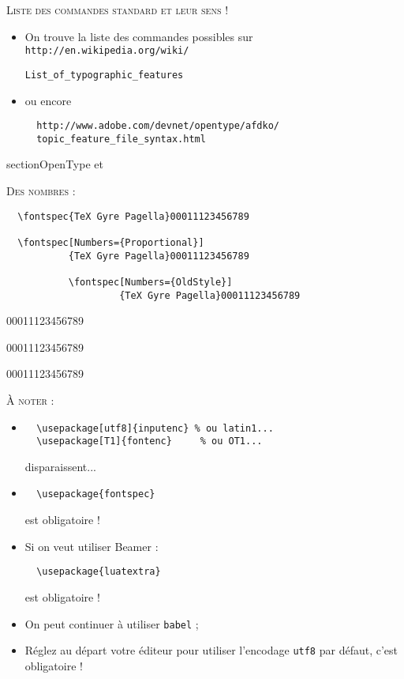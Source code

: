 \documentclass[12pt,a4paper,twocolumn]{book} %
\begin{document}
{		                          
		                          {\textsc{Liste des commandes standard et leur sens !}}
			                  
			                  \begin{itemize}
				          \item On trouve la liste des commandes possibles sur \verb=http://en.wikipedia.org/wiki/=
				            
				            \qquad\qquad\qquad\verb=List_of_typographic_features=
				          \item ou encore \begin{verbatim}
  http://www.adobe.com/devnet/opentype/afdko/
  topic_feature_file_syntax.html
\end{verbatim}
			                  \end{itemize}
		                          
		                          
	                                  section{OpenType et \LuaLaTeX}	
		                          
		                          
	                                  {\textsc{Des nombres :}}
\begin{verbatim}
  \fontspec{TeX Gyre Pagella}00011123456789

  \fontspec[Numbers={Proportional}]
           {TeX Gyre Pagella}00011123456789

           \fontspec[Numbers={OldStyle}]
                    {TeX Gyre Pagella}00011123456789
\end{verbatim}	


00011123456789

00011123456789

         00011123456789			
                  
                  
                  
                  
                  
                  {\textsc{À noter :}}
                  \begin{itemize}
                  \item	\begin{verbatim}
  \usepackage[utf8]{inputenc} % ou latin1...
  \usepackage[T1]{fontenc}     % ou OT1...
\end{verbatim}
  disparaissent...
\item	\begin{verbatim}
  \usepackage{fontspec}
\end{verbatim}
  est obligatoire !
\item	Si on veut utiliser Beamer :
\begin{verbatim}
  \usepackage{luatextra}
\end{verbatim}
est obligatoire !
\item	On peut continuer à utiliser \texttt{babel} ;
\item	Réglez au départ votre éditeur pour utiliser l'encodage \texttt{utf8} par défaut, c'est obligatoire !
                  \end{itemize}                 
                  
}
\end{document}
